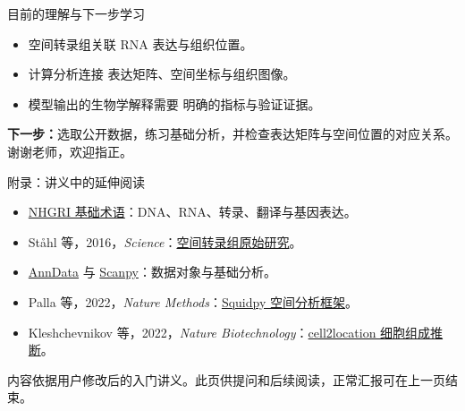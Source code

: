 \documentclass[aspectratio=169,11pt]{beamer}
\newcommand{\source}[1]{\vfill\par{\fontsize{6.5}{8}\selectfont\color{Muted}#1\par}}
\newcommand{\wideitems}{\setlength{\itemsep}{.7em}}
\begin{document}
\begin{frame}{目前的理解与下一步学习}
\begin{itemize}\wideitems
\item 空间转录组关联 \alert{RNA 表达与组织位置}。
\item 计算分析连接 \alert{表达矩阵、空间坐标与组织图像}。
\item 模型输出的生物学解释需要 \alert{明确的指标与验证证据}。
\end{itemize}
\vspace{5mm}
\textbf{下一步：}选取公开数据，练习基础分析，并检查表达矩阵与空间位置的对应关系。
\medskip
{\color{Muted}谢谢老师，欢迎指正。}
\end{frame}

\appendix
\begin{frame}[noframenumbering]{附录：讲义中的延伸阅读}
\small
\begin{itemize}\wideitems
\item \href{https://www.genome.gov/genetics-glossary}{NHGRI 基础术语}：DNA、RNA、转录、翻译与基因表达。
\item St\aa hl 等，2016，\textit{Science}：\href{https://www.science.org/doi/10.1126/science.aaf2403}{空间转录组原始研究}。
\item \href{https://anndata.readthedocs.io/en/stable/generated/anndata.AnnData.html}{AnnData} 与 \href{https://scanpy.readthedocs.io/en/stable/tutorials/basics/clustering.html}{Scanpy}：数据对象与基础分析。
\item Palla 等，2022，\textit{Nature Methods}：\href{https://www.nature.com/articles/s41592-021-01358-2}{Squidpy 空间分析框架}。
\item Kleshchevnikov 等，2022，\textit{Nature Biotechnology}：\href{https://www.nature.com/articles/s41587-021-01139-4}{cell2location 细胞组成推断}。
\end{itemize}
\source{内容依据用户修改后的入门讲义。此页供提问和后续阅读，正常汇报可在上一页结束。}
\end{frame}
\end{document}
